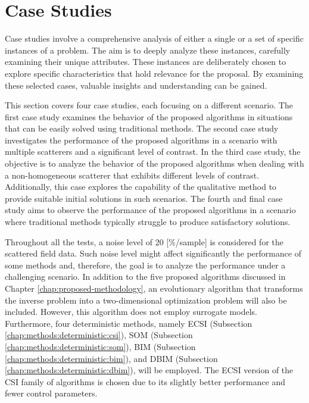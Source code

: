 	\section{Case Studies}\label{chap:results:casestudy}
		
		
		Case studies involve a comprehensive analysis of either a single or a set of specific instances of a problem. The aim is to deeply analyze these instances, carefully examining their unique attributes. These instances are deliberately chosen to explore specific characteristics that hold relevance for the proposal. By examining these selected cases, valuable insights and understanding can be gained.
		
		This section covers four case studies, each focusing on a different scenario. The first case study examines the behavior of the proposed algorithms in situations that can be easily solved using traditional methods. The second case study investigates the performance of the proposed algorithms in a scenario with multiple scatterers and a significant level of contrast. In the third case study, the objective is to analyze the behavior of the proposed algorithms when dealing with a non-homogeneous scatterer that exhibits different levels of contrast. Additionally, this case explores the capability of the qualitative method to provide suitable initial solutions in such scenarios. The fourth and final case study aims to observe the performance of the proposed algorithms in a scenario where traditional methods typically struggle to produce satisfactory solutions.
		
		Throughout all the tests, a noise level of 20 [\%/sample] is considered for the scattered field data. Such noise level might affect significantly the performance of some methods and, therefore, the goal is to analyze the performance under a challenging scenario. In addition to the five proposed algorithms discussed in Chapter \ref{chap:proposed-methodology}, an evolutionary algorithm that transforms the inverse problem into a two-dimensional optimization problem will also be included. However, this algorithm does not employ surrogate models. Furthermore, four deterministic methods, namely ECSI (Subsection \ref{chap:methods:deterministic:csi}), SOM (Subsection \ref{chap:methods:deterministic:som}), BIM (Subsection \ref{chap:methods:deterministic:bim}), and DBIM (Subsection \ref{chap:methods:deterministic:dbim}), will be employed. The ECSI version \cite{berg1999extended} of the CSI family of algorithms is chosen due to its slightly better performance and fewer control parameters.
		
